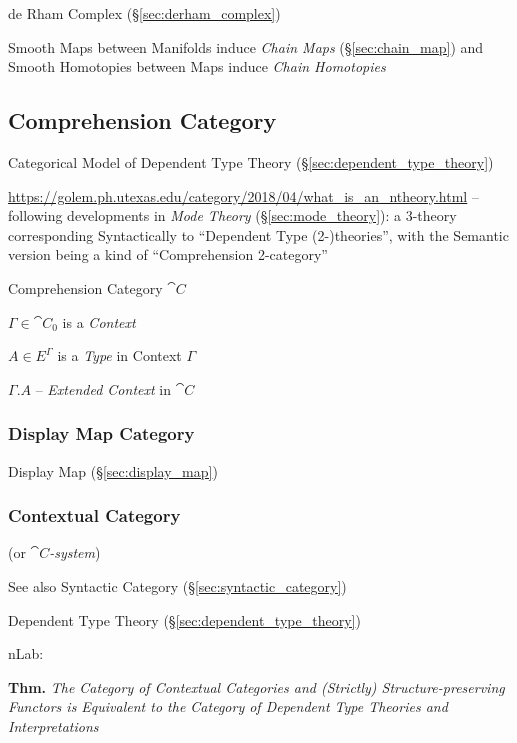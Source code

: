 de Rham Complex (\S\ref{sec:derham_complex})

Smooth Maps between Manifolds induce \emph{Chain Maps} (\S\ref{sec:chain_map})
and Smooth Homotopies between Maps induce \emph{Chain Homotopies}



\subsection{Comprehension Category}\label{sec:comprehension_category}

Categorical Model of Dependent Type Theory (\S\ref{sec:dependent_type_theory})

\url{https://golem.ph.utexas.edu/category/2018/04/what_is_an_ntheory.html} --
following developments in \emph{Mode Theory} (\S\ref{sec:mode_theory}): a
$3$-theory corresponding Syntactically to ``Dependent Type (2-)theories'', with
the Semantic version being a kind of ``Comprehension 2-category''

Comprehension Category $\cat{C}$

$\Gamma \in \cat{C}_0$ is a \emph{Context}

$A \in E^\Gamma$ is a \emph{Type} in Context $\Gamma$

$\Gamma.A$ -- \emph{Extended Context} in $\cat{C}$



\subsubsection{Display Map Category}\label{sec:display_map_category}

Display Map (\S\ref{sec:display_map})



\subsubsection{Contextual Category}\label{sec:contextual_category}

(or \emph{$\cat{C}$-system})

\fist See also Syntactic Category (\S\ref{sec:syntactic_category})

Dependent Type Theory (\S\ref{sec:dependent_type_theory})

nLab:

\textbf{Thm.} \emph{The Category of Contextual Categories and
  (Strictly) Structure-preserving Functors is Equivalent to the
  Category of Dependent Type Theories and Interpretations} %



